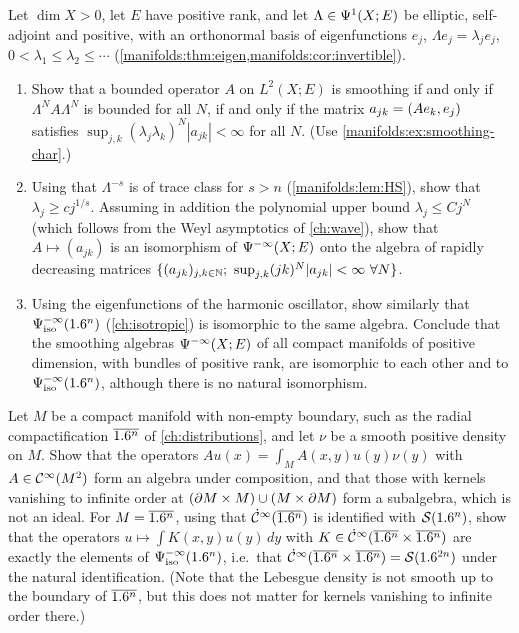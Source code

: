 \begin{exercise}\label{manifolds:ex:rapidly-decreasing}
Let $\dim X>0$, let $E$ have positive rank, and let $\Lambda\in\Psi^{1}(X;E)$ be elliptic, self-adjoint and positive, with an
orthonormal basis of eigenfunctions $e_j$, $\Lambda e_j=\lambda_je_j$, $0<\lambda_1\le\lambda_2\le\cdots$
(\cref{manifolds:thm:eigen,manifolds:cor:invertible}).
\begin{enumerate}[label=(\alph*)]
\item Show that a bounded operator $A$ on $L^2(X;E)$ is smoothing if and only if
$\Lambda^NA\Lambda^N$ is bounded for all $N$, if and only if the matrix
$a_{jk}=( Ae_k, e_j)$ satisfies $\sup_{j,k}(\lambda_j\lambda_k)^N|a_{jk}|<\infty$ for all $N$.
(Use \cref{manifolds:ex:smoothing-char}.)
\item Using that $\Lambda^{-s}$ is of trace class for $s>n$ (\cref{manifolds:lem:HS}), show
that $\lambda_j\ge cj^{1/s}$. Assuming in addition the polynomial upper bound
$\lambda_j\le Cj^N$ (which follows from the Weyl asymptotics of \cref{ch:wave}), show that
$A\mapsto(a_{jk})$ is an isomorphism of $\Psi^{-\infty}(X;E)$ onto the algebra of
rapidly decreasing matrices
$\{(a_{jk})_{j,k\in\N};\ \sup_{j,k}(jk)^N|a_{jk}|<\infty\ \forall N\}$.
\item Using the eigenfunctions of the harmonic oscillator, show similarly that
$\Psi^{-\infty}_{\mathrm{iso}}(1.6^n)$ (\cref{ch:isotropic}) is isomorphic to the same algebra.
Conclude that the smoothing algebras $\Psi^{-\infty}(X;E)$ of all compact manifolds of positive
dimension, with bundles of positive rank, are
isomorphic to each other and to $\Psi^{-\infty}_{\mathrm{iso}}(1.6^n)$, although there is no natural
isomorphism.
\end{enumerate}
\end{exercise}

\begin{exercise}\label{manifolds:ex:boundary-smoothing}
Let $M$ be a compact manifold with non-empty boundary, such as the radial compactification
$\overline{1.6^n}$ of \cref{ch:distributions}, and let $\nu$ be a smooth positive density on $M$.
Show that the operators $Au(x)=\int_MA(x,y)u(y)\nu(y)$ with $A\in\mathcal{C}^\infty(M^2)$ form an algebra
under composition, and that those with kernels vanishing to infinite order at
$(\partial M\times M)\cup(M\times\partial M)$ form a subalgebra, which is not an ideal. For
$M=\overline{1.6^n}$, using that $\dot{\mathcal{C}}^\infty(\overline{1.6^n})$ is identified with $\mathcal{S}(1.6^n)$, show that the
operators $u\mapsto\int K(x,y)u(y)\,dy$ with $K\in\dot{\mathcal{C}}^\infty(\overline{1.6^n}\times\overline{1.6^n})$ are exactly
the elements of $\Psi^{-\infty}_{\mathrm{iso}}(1.6^n)$, i.e.\ that
$\dot{\mathcal{C}}^\infty(\overline{1.6^n}\times\overline{1.6^n})=\mathcal{S}(1.6^{2n})$ under the natural identification. (Note that the
Lebesgue density is not smooth up to the boundary of $\overline{1.6^n}$, but this does not
matter for kernels vanishing to infinite order there.)
\end{exercise}

